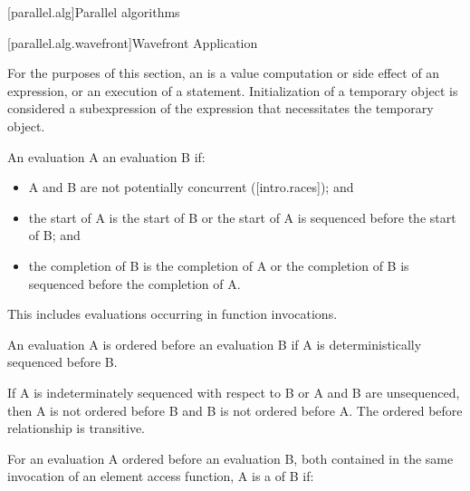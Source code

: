
[parallel.alg]{Parallel algorithms}

[parallel.alg.wavefront]{Wavefront Application}

\pnum For the purposes of this section, an  is a value
computation or side effect of an expression, or an execution of a statement.
Initialization of a temporary object is considered a subexpression of the
expression that necessitates the temporary object.

\pnum An evaluation A  an evaluation B if:

\begin{itemize}
\item A and B are not potentially concurrent ([intro.races]); and
\item the start of A is the start of B or the start of A is sequenced before the start of B; and
\item the completion of B is the completion of A or the completion of B is sequenced before the completion of A.
\end{itemize}

\begin{note}
This includes evaluations occurring in function invocations.
\end{note}

\pnum An evaluation A is ordered before an evaluation B if A is
deterministically sequenced before B. \begin{note}If A is indeterminately
sequenced with respect to B or A and B are unsequenced, then A is not ordered
before B and B is not ordered before A. The ordered before relationship is
transitive.\end{note}

\pnum For an evaluation A ordered before an evaluation B, both contained in the
same invocation of an element access function, A is a  of B if:

